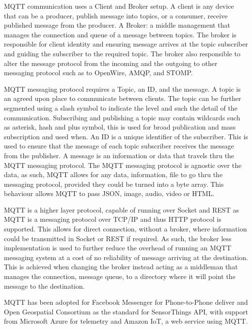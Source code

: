 MQTT communication uses a Client and Broker setup. A client is any device that can be a producer, publish message into topics, or a consumer, receive published message from the producer. A Broker: a middle management that manages the connection and queue of a message between topics. The broker is responsible for client identity and ensuring message arrives at the topic subscriber and guiding the subscriber to the required topic. The broker also responsible to alter the message protocol from the incoming and the outgoing to other messaging protocol such as to OpenWire, AMQP, and STOMP.

MQTT messaging protocol requires a Topic, an ID, and the message. A topic is an agreed upon place to communicate between clients. The topic can be further segmented using a slash symbol to indicate the level and such the detail of the communication. Subscribing and publishing a topic may contain wildcards such as asterisk, hash and plus symbol, this is used for broad publication and mass subscription and used when. An ID is a unique identifier of the subscriber. This is used to ensure that the message of each topic subscriber receives the message from the publisher. A message is an information or data that travels thru the MQTT messaging protocol. The MQTT messaging protocol is agnostic over the data, as such, MQTT allows for any data, information, file to go thru the messaging protocol, provided they could be turned into a byte array. This behaviour allows MQTT to pass JSON, image, audio, video or HTML.

MQTT is a higher layer protocol, capable of running over Socket and REST as MQTT is a messaging protocol over TCP/IP and thus HTTP protocol is supported. This allows for direct connection, without a broker, where information could be transmitted in Socket or REST if required. As such, the broker less implementation is used to further reduce the overhead of running an MQTT messaging system at a cost of no reliability of message arriving at the destination. This is achieved when changing the broker instead acting as a middleman that manages the connection, message queue,  to a directory where it will point the message to the destination.

MQTT has been adopted for Facebook Messenger for Phone-to-Phone deliver and Open Geospatial Consortium as the standard for SensorThings API, with support from Microsoft Azure for telemetry and Amazon IoT, a web service using MQTT\@.

